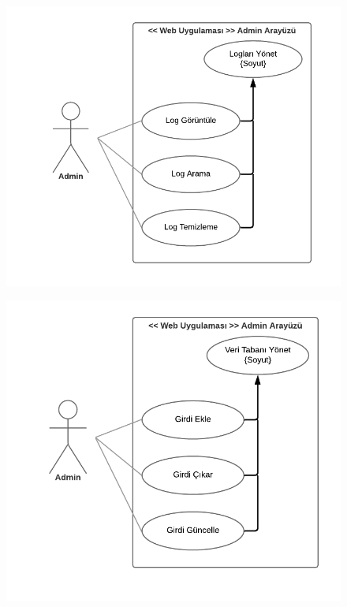 \newpage
\begin{figure}[h!]
    \centering
    \includegraphics{Report/images/use3.png}
    \label{fig:use3}
\end{figure}
\newpage
\begin{figure}[h!]
    \centering
    \includegraphics{Report/images/use4.png}
    \label{fig:use4}
\end{figure}
\newpage

